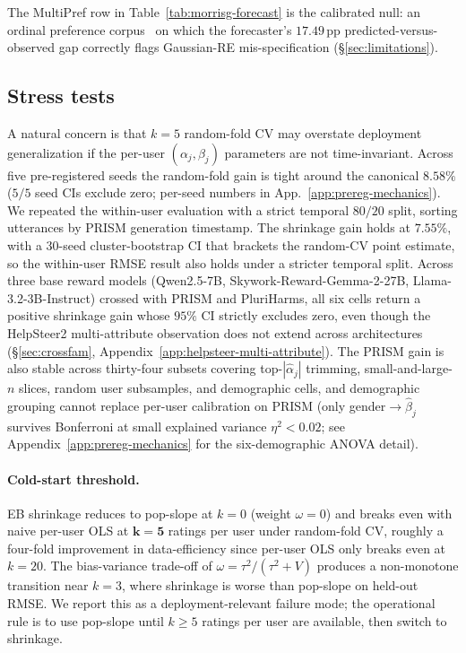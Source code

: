 \documentclass{article}
\begin{document}
The MultiPref row in Table~\ref{tab:morrisg-forecast} is the
calibrated null: an ordinal preference
corpus~\citep{miranda2024hybrid} on which the
forecaster's $17.49$\,pp predicted-versus-observed gap correctly
flags Gaussian-RE mis-specification (\S\ref{sec:limitations}).

\subsection{Stress tests}\label{sec:stress-tests}

A natural concern is that $k{=}5$ random-fold CV may overstate
deployment generalization if the per-user $(\alpha_j,\beta_j)$
parameters are not time-invariant. Across five pre-registered
seeds the random-fold gain is tight around the canonical
$8.58\%$ ($5/5$ seed CIs exclude zero; per-seed numbers in
App.~\ref{app:prereg-mechanics}). We repeated the within-user
evaluation with a strict temporal $80/20$ split, sorting utterances
by PRISM generation timestamp. The shrinkage gain holds at
$\bm{7.55\%}$, with a $30$-seed cluster-bootstrap CI that brackets
the random-CV point estimate, so the within-user RMSE
result also holds under a stricter temporal split. Across three
base reward models (Qwen2.5-7B, Skywork-Reward-Gemma-2-27B,
Llama-3.2-3B-Instruct) crossed with PRISM and PluriHarms, all six
cells return a positive shrinkage gain whose $95\%$ CI strictly
excludes zero, even though the HelpSteer2 multi-attribute
observation does not extend across architectures
(\S\ref{sec:crossfam},
Appendix~\ref{app:helpsteer-multi-attribute}). The PRISM gain is
also stable across thirty-four subsets covering
top-$|\hat\alpha_j|$ trimming, small-and-large-$n$ slices, random
user subsamples, and demographic cells, and demographic grouping
cannot replace per-user calibration on PRISM (only
gender${\to}\hat\beta_j$ survives Bonferroni at small explained
variance $\eta^2{<}0.02$; see Appendix~\ref{app:prereg-mechanics}
for the six-demographic ANOVA detail).

\paragraph{Cold-start threshold.}
EB shrinkage reduces to pop-slope at $k{=}0$ (weight $\omega{=}0$)
and breaks even with naive per-user OLS at $\bm{k{=}5}$
ratings per user under random-fold CV, roughly a four-fold
improvement in data-efficiency since per-user OLS only breaks
even at $k{=}20$. The bias-variance trade-off of
$\omega{=}\tau^2/(\tau^2+V)$ produces a non-monotone transition near
$k{=}3$, where shrinkage is worse than pop-slope on held-out RMSE.
We report this as a deployment-relevant failure mode; the operational
rule is to use pop-slope until $k{\ge}5$ ratings per user are
available, then switch to shrinkage.
\end{document}
